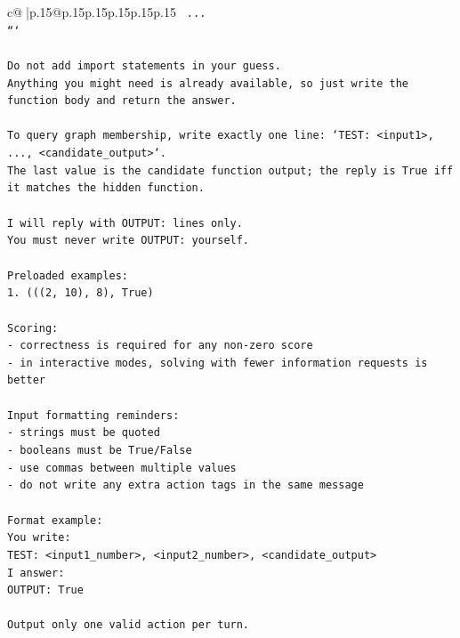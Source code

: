 \documentclass{article}
\begin{document}
{\begin{supertabular}{c@{$\;$}|p{.15\linewidth}@{}p{.15\linewidth}p{.15\linewidth}p{.15\linewidth}p{.15\linewidth}p{.15\linewidth}}
{{{\texttt{    ...} \\
\texttt{```} \\
\\ 
\texttt{Do not add import statements in your guess.} \\
\texttt{Anything you might need is already available, so just write the function body and return the answer.} \\
\\ 
\texttt{To query graph membership, write exactly one line: `TEST: <input1>, ..., <candidate\_output>`.} \\
\texttt{The last value is the candidate function output; the reply is True iff it matches the hidden function.} \\
\\ 
\texttt{I will reply with OUTPUT: lines only.} \\
\texttt{You must never write OUTPUT: yourself.} \\
\\ 
\texttt{Preloaded examples:} \\
\texttt{1. (((2, 10), 8), True)} \\
\\ 
\texttt{Scoring:} \\
\texttt{{-} correctness is required for any non{-}zero score} \\
\texttt{{-} in interactive modes, solving with fewer information requests is better} \\
\\ 
\texttt{Input formatting reminders:} \\
\texttt{{-} strings must be quoted} \\
\texttt{{-} booleans must be True/False} \\
\texttt{{-} use commas between multiple values} \\
\texttt{{-} do not write any extra action tags in the same message} \\
\\ 
\texttt{Format example:} \\
\texttt{You write:} \\
\texttt{TEST: <input1\_number>, <input2\_number>, <candidate\_output>} \\
\texttt{I answer:} \\
\texttt{OUTPUT: True} \\
\\ 
\texttt{Output only one valid action per turn.} \\
            }
        }
    }
     \\ \\


\end{supertabular}}
\end{document}
